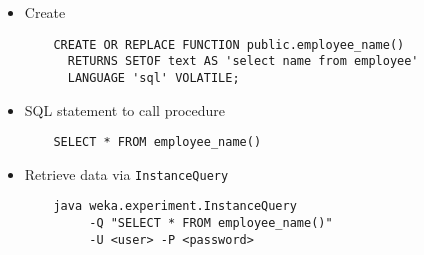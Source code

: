 \begin{itemize}
	\item Create
	\begin{verbatim}
	CREATE OR REPLACE FUNCTION public.employee_name()
	  RETURNS SETOF text AS 'select name from employee'
	  LANGUAGE 'sql' VOLATILE;
	\end{verbatim}

	\item SQL statement to call procedure
	\begin{verbatim}
	SELECT * FROM employee_name()
	\end{verbatim}

	\item Retrieve data via \texttt{InstanceQuery}
	\begin{verbatim}
	java weka.experiment.InstanceQuery
	     -Q "SELECT * FROM employee_name()"
	     -U <user> -P <password>
	\end{verbatim}
\end{itemize}

